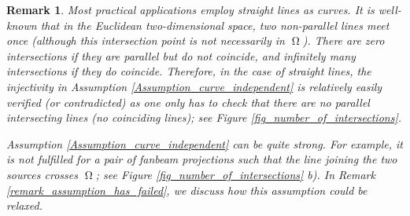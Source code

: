 \documentclass[12pt]{article}
\newtheorem{remark}[theorem]{Remark}
\newcommand{\dd}[1]{\,\mathrm{d}{#1}}
\DeclareMathOperator{\rayvariable}{r}
\DeclareMathOperator{\rayinverse}{\rho}
\DeclareMathOperator{\imgdom}{{\Omega}}
\begin{document}
\begin{remark} \label{Remark_Assumption_violated_Fanbeam}
Most practical applications employ straight lines as curves. It is well-known that in the Euclidean two-dimensional space, two non-parallel lines meet once (although this intersection point is not necessarily in $\imgdom$). There are zero intersections if they are parallel but do not coincide, and infinitely many intersections if they do coincide.
Therefore, in the case of straight lines, the injectivity in Assumption \ref{Assumption_curve_independent} is relatively easily verified (or contradicted) as one only has to check that there are no parallel intersecting lines (no coinciding lines); see Figure \ref{fig_number_of_intersections}.


Assumption \ref{Assumption_curve_independent} can be quite strong. For example, it is not fulfilled for a pair of fanbeam projections such that the line joining the two sources crosses $\imgdom$; see Figure \ref{fig_number_of_intersections} b). 
 In Remark \ref{remark_assumption_has_failed}, we discuss how this assumption could be relaxed.


\begin{figure}
\center
\newcommand{\myfiguresize}{1.3}


\end{figure}
\end{remark}
\end{document}
